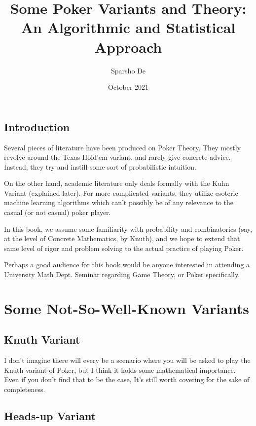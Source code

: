 \documentclass{book}
\title{Some Poker Variants and Theory: An Algorithmic and Statistical Approach}
\author{Sparsho De }
\date{October 2021}
\begin{document}
\maketitle

\section*{Introduction}
Several pieces of literature have been produced on Poker Theory. They mostly revolve around the Texas Hold'em variant, and rarely give concrete advice. Instead, they try and instill some sort of probabilistic intuition.

On the other hand, academic literature only deals formally with the Kuhn Variant (explained later). For more complicated variants, they utilize esoteric machine learning algorithms which can't possibly be of any relevance to the casual (or not casual) poker player.

In this book, we assume some familiarity with probability and combinatorics (say, at the level of Concrete Mathematics, by Knuth), and we hope to extend that same level of rigor and problem solving to the actual practice of playing Poker.

Perhaps a good audience for this book would be anyone interested in attending a University Math Dept. Seminar regarding Game Theory, or Poker specifically.

\newpage

\tableofcontents

\chapter{Some Not-So-Well-Known Variants}

\section*{Knuth Variant}

I don't imagine there will every be a scenario where you will be asked to play the Knuth variant of Poker, but I think it holds some mathematical importance. Even if you don't find that to be the case, It's still worth covering for the sake of completeness. 

\section*{Heads-up Variant}
\end{document}

